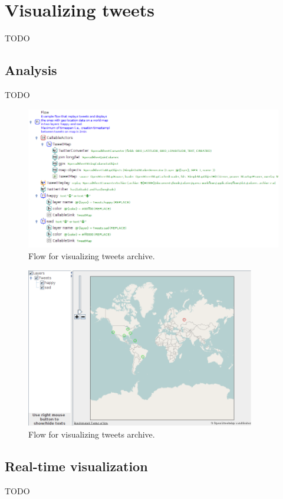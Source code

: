 \documentclass[a4paper,10pt]{book}
\begin{document}
\section{Visualizing tweets}
TODO

\subsection{Analysis}
TODO

\begin{figure}[htb]
  \centering
  \includegraphics[width=12.0cm]{images/visualize_tweets-archive-flow.png}
  \caption{Flow for visualizing tweets archive.}
  \label{visualize_tweets-archive-flow}
\end{figure}

\begin{figure}[htb]
  \centering
  \includegraphics[width=10.0cm]{images/visualize_tweets-archive-output.png}
  \caption{Flow for visualizing tweets archive.}
  \label{visualize_tweets-archive-output}
\end{figure}

\subsection{Real-time visualization}
TODO
\end{document}
